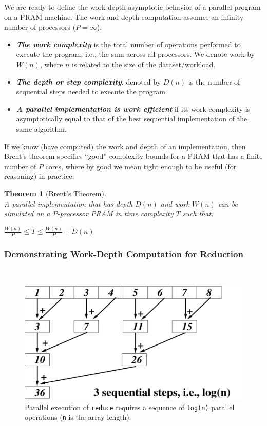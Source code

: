 \documentclass[acmsmall,review]{acmart}\settopmatter{printfolios=true,printccs=false,printacmref=false}
\newtheorem{mytheo}{Theorem}
\begin{document}
We are ready to define the work-depth asymptotic behavior of a parallel
program on a PRAM machine. The work and depth computation assumes an
infinity number of processors ($P = \infty$).
\begin{itemize}
    \item \emph{\bf The work complexity} is the total number of operations
        performed to execute the program, i.e., the sum across all processors.
        We denote work by $W(n)$, where $n$ is related to the size of the
        dataset/workload.
    
    \item \emph{\bf The depth or step complexity}, denoted by $D(n)$ is 
        the number of sequential steps needed to execute the program.

    \item \emph{\bf A parallel implementation is work efficient} if its work
        complexity is asymptotically equal to that of the best sequential 
        implementation of the same algorithm.
\end{itemize} 

If we know (have computed) the work and depth of an implementation, then 
Brent's theorem specifies ``good'' complexity bounds for a PRAM that has
a finite number of $P$ cores, where by good we mean tight enough to be 
useful (for reasoning) in practice.

\begin{mytheo}[Brent's Theorem]\label{Brent-TH}
$\mbox{ }$\\
A parallel implementation that has depth $D(n)$ and work $W(n)$
can be simulated on a $P$-processor PRAM in time complexity $T$ 
such that:
\begin{center}
$\frac{W(n)}{P} \leq T \leq \frac{W(n)}{P} + D(n)$
\end{center}
\end{mytheo}

\subsubsection{Demonstrating Work-Depth Computation for Reduction}
\label{subsubsub:work-depth}
$\mbox{ }$\\

\begin{figure}
\includegraphics[width=40ex]{Figures/L1/ReduceEg.pdf}
\caption{Parallel execution of \lstinline{reduce} requires
        a sequence of \lstinline{log(n)} parallel operations
        ({\tt n} is the array length).}
\label{fig:red-tree-again}
\end{figure} 
\end{document}
